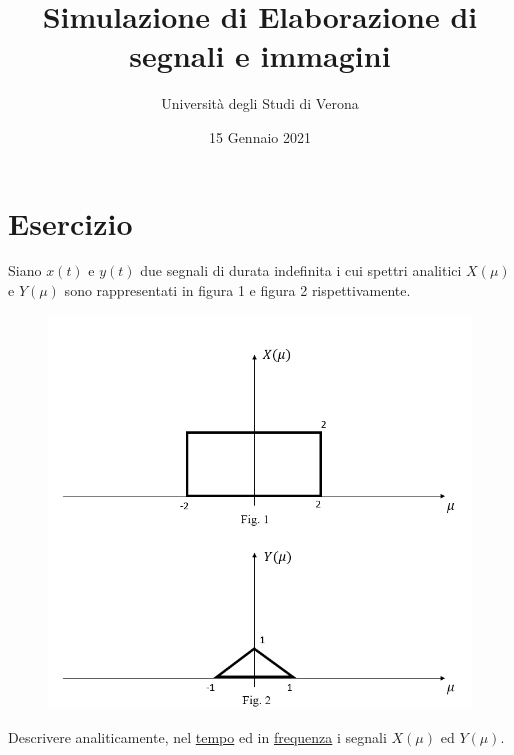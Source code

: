 \documentclass[a4paper]{article}
\begin{document}
	\author{Università degli Studi di Verona}
	\title{Simulazione di Elaborazione di segnali e immagini}
	\date{{\Large 15 Gennaio 2021}}
	\maketitle
	
	\section{Esercizio}
	
	Siano $x\left(t\right)$ e $y\left(t\right)$ due segnali di durata indefinita i cui spettri analitici $X\left(\mu\right)$ e $Y\left(\mu\right)$ sono rappresentati in figura 1 e figura 2 rispettivamente.
	\begin{figure}[!htp]
		\centering
		\includegraphics[width=\textwidth]{img/fig_1.png}
	\end{figure}

	\noindent
	Descrivere analiticamente, nel \underline{tempo} ed in \underline{frequenza} i segnali $X\left(\mu\right)$ ed $Y\left(\mu\right)$.\newpage
	
\end{document}
